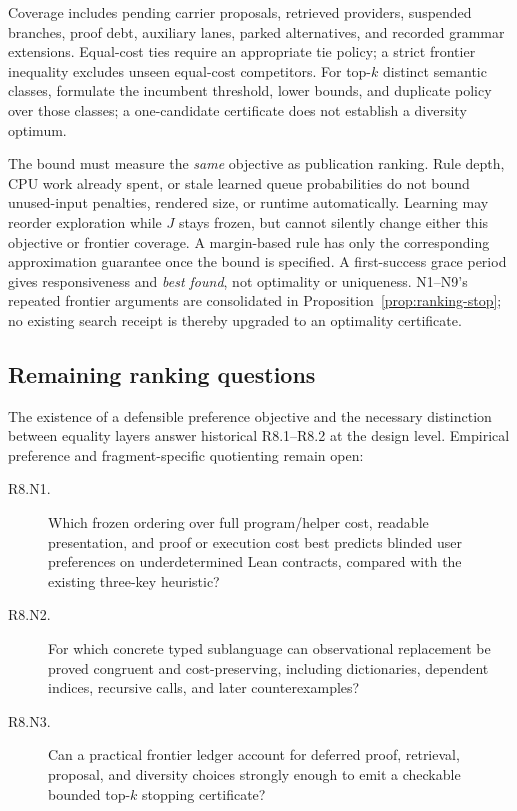 Coverage includes pending carrier proposals, retrieved providers, suspended branches, proof debt, auxiliary lanes, parked alternatives, and recorded grammar extensions. Equal-cost ties require an appropriate tie policy; a strict frontier inequality excludes unseen equal-cost competitors. For top-$k$ distinct semantic classes, formulate the incumbent threshold, lower bounds, and duplicate policy over those classes; a one-candidate certificate does not establish a diversity optimum.

The bound must measure the \emph{same} objective as publication ranking. Rule depth, CPU work already spent, or stale learned queue probabilities do not bound unused-input penalties, rendered size, or runtime automatically. Learning may reorder exploration while $J$ stays frozen, but cannot silently change either this objective or frontier coverage. A margin-based rule has only the corresponding approximation guarantee once the bound is specified. A first-success grace period gives responsiveness and \emph{best found}, not optimality or uniqueness. N1--N9's repeated frontier arguments are consolidated in Proposition~\ref{prop:ranking-stop}; no existing search receipt is thereby upgraded to an optimality certificate.

\subsection{Remaining ranking questions}\label{sec:ranking-open}

The existence of a defensible preference objective and the necessary distinction between equality layers answer historical R8.1--R8.2 at the design level. Empirical preference and fragment-specific quotienting remain open:
\begin{description}
\item[R8.N1.] Which frozen ordering over full program/helper cost, readable presentation, and proof or execution cost best predicts blinded user preferences on underdetermined Lean contracts, compared with the existing three-key heuristic?
\item[R8.N2.] For which concrete typed sublanguage can observational replacement be proved congruent and cost-preserving, including dictionaries, dependent indices, recursive calls, and later counterexamples?
\item[R8.N3.] Can a practical frontier ledger account for deferred proof, retrieval, proposal, and diversity choices strongly enough to emit a checkable bounded top-$k$ stopping certificate?
\end{description}

